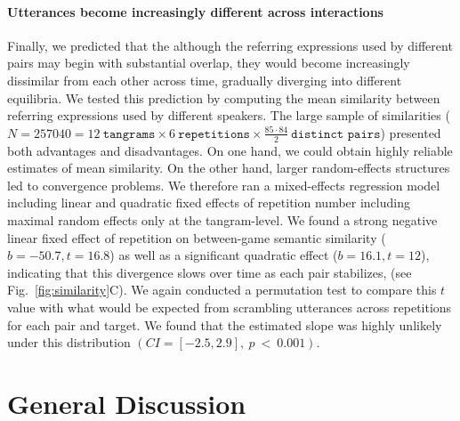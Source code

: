 \documentclass[alpha-refs]{wiley-article}
\begin{document}
\paragraph{Utterances become increasingly different across interactions}

Finally, we predicted that the although the referring expressions used by different pairs may begin with substantial overlap, they would become increasingly dissimilar from each other across time, gradually diverging into different equilibria.
We tested this prediction by computing the mean similarity between referring expressions used by different speakers.
The large sample of similarities ($N = 257040 = 12~\texttt{tangrams} \times 6~\texttt{repetitions} \times \frac{85 \cdot 84}{2}~\texttt{distinct pairs}$) presented both advantages and disadvantages.
On one hand, we could obtain highly reliable estimates of mean similarity. 
On the other hand, larger random-effects structures led to convergence problems.
We therefore ran a mixed-effects regression model including linear and quadratic fixed effects of repetition number including maximal random effects only at the tangram-level. 
We found a strong negative linear fixed effect of repetition on between-game semantic similarity ($b = -50.7, t= 16.8$) as well as a significant quadratic effect ($b= 16.1, t = 12$), indicating that this divergence slows over time as each pair stabilizes, (see Fig.~\ref{fig:similarity}C).
We again conducted a permutation test to compare this $t$ value with what would be expected from scrambling utterances across repetitions for each pair and target.
We found that the estimated slope was highly unlikely under this distribution $(CI = [-2.5, 2.9],~p~<~0.001)$. 


\section{General Discussion}
\label{sec:discussion}
\end{document}
